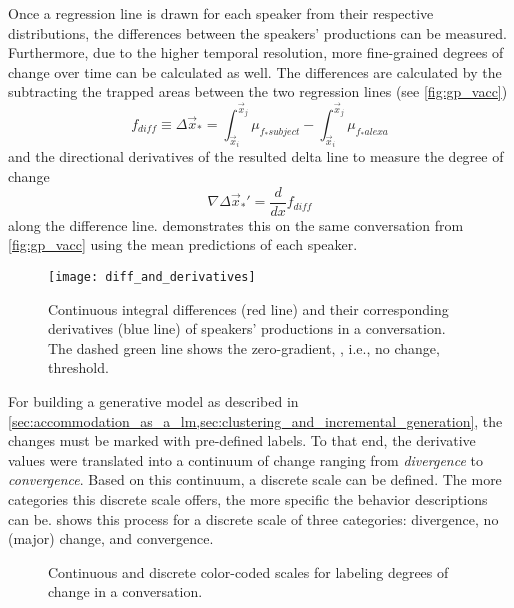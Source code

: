 Once a regression line is drawn for each speaker from their respective distributions, the differences between the speakers' productions can be measured.
Furthermore, due to the higher temporal resolution, more fine-grained degrees of change over time can be calculated as well.
The differences are calculated by the subtracting the trapped areas between the two regression lines (see \cref{fig:gp_vacc})
%
\begin{equation}
	f_{diff} \equiv\Delta\vec{x}_* =
	\int_{\vec{x}_i}^{\vec{x}_{j}}\mu_{f_*subject} -
	\int_{\vec{x}_i}^{\vec{x}_{j}}\mu_{f_*alexa}
\end{equation}
%
and the directional derivatives of the resulted delta line to measure the degree of change
%
\begin{equation}
	\nabla\Delta\vec{x}_*' = \frac{d}{dx}f_{diff}
\end{equation}
%
along the difference line.
 demonstrates this on the same conversation from \cref{fig:gp_vacc} using the mean predictions of each speaker.
%
\begin{figure}[t]
	\centering
	\texttt{[image: diff\_and\_derivatives]}
	\caption[Continuous integral differences and derivatives in a \acl{hci}]
		{Continuous integral differences (red line) and their corresponding derivatives (blue line) of speakers' productions in a conversation.
		 The dashed green line shows the zero-gradient, , i.e., no change, threshold.}
	\label{fig:diff_and_derivatives}
\end{figure}
%
For building a generative model as described in \cref{sec:accommodation_as_a_lm,sec:clustering_and_incremental_generation}, the changes must be marked with pre-defined labels.
To that end, the derivative values were translated into a continuum of change ranging from \textit{divergence} to \textit{convergence}.
Based on this continuum, a discrete scale can be defined.
The more categories this discrete scale offers, the more specific the behavior descriptions can be.
 shows this process for a discrete scale of three categories: divergence, no (major) change, and convergence.
%
\begin{figure}[t]
	\centering
	\hfill
	\caption[Continuous and discrete scales for labeling degrees of change]
		{Continuous and discrete color-coded scales for labeling degrees of change in a conversation.}
	\label{fig:cont_disc_scales}
\end{figure}

